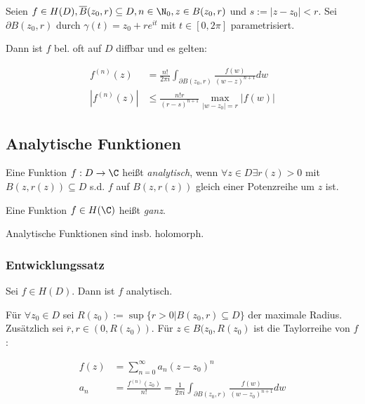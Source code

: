 Seien \(f \in H(D), \overline B(z_0,r) \subseteq D, n \in \N_0, z \in B(z_0,r)\) und \(s := |z-z_0| < r\). Sei \(\partial B(z_0,r)\) durch \(\gamma(t) = z_0 + re^{it}\) mit \(t \in [0,2\pi]\) parametrisiert.

Dann ist \(f\) bel. oft auf \(D\) diffbar und es gelten:

\vspace*{-4mm}
\begin{align*}
	f^{(n)}(z) &= \frac{n!}{2\pi i} \int_{\partial B(z_0,r)} \frac{f(w)}{(w-z)^{n+1}} dw \\
	|f^{(n)}(z)| &\leq \frac{n!r}{(r-s)^{n+1}} \max_{|w-z_0|=r} |f(w)|
\end{align*}

\subsection*{Analytische Funktionen}

Eine Funktion \(f : D \to \C\) heißt \emph{analytisch}, wenn \(\forall z \in D \exists r(z) > 0\) mit \(B(z,r(z)) \subseteq D\) s.d. \(f\) auf \(B(z,r(z))\) gleich einer Potenzreihe um \(z\) ist.

\vspace*{1mm}

Eine Funktion \(f \in H(\C)\) heißt \emph{ganz}.

\vspace*{1mm}

Analytische Funktionen sind insb. holomorph.

\subsubsection*{Entwicklungssatz}

Sei \(f \in H(D)\). Dann ist \(f\) analytisch.

\spacing

Für \(\forall z_0 \in D\) sei \(R(z_0) := \sup\{r > 0 | B(z_0,r) \subseteq D \}\) der maximale Radius. Zusätzlich sei \(\overline r, r \in (0,R(z_0))\). Für \(z \in B(z_0, R(z_0)\) ist die Taylorreihe von \(f\):

\vspace*{-6mm}
\begin{align*}
f(z) &= \sum_{n=0}^\infty a_n(z-z_0)^n \\
a_n &= \frac{f^{(n)}(z_0)}{n!} = \frac{1}{2\pi i} \int_{\partial B(z_0,r)} \frac{f(w)}{(w-z_0)^{n+1}} dw
\end{align*}

